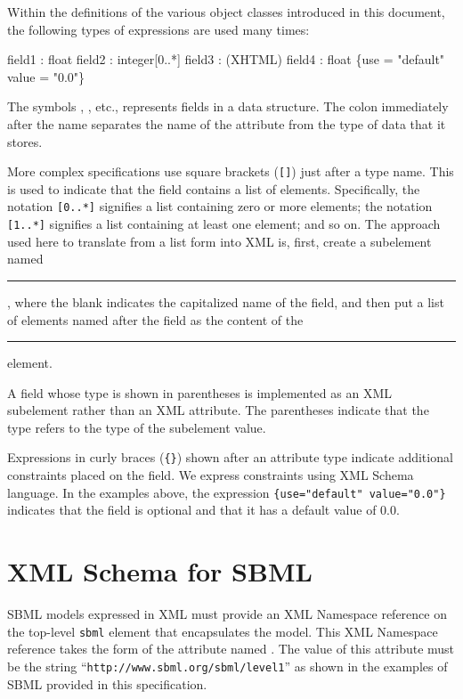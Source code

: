 \documentclass[10pt]{cekarticle}
\newenvironment{blockChanged}{\color{BrickRed}}{}
\begin{document}
Within the definitions of the various object classes introduced in this
document, the following types of expressions are used many times:

\begin{example}
  field1 : float
  field2 : integer[0..*]
  field3 : (XHTML)
  field4 : float \{use = "default" value = "0.0"\}
\end{example}

The symbols , , etc., represents fields in a
data structure.  The colon immediately after the name separates the name of
the attribute from the type of data that it stores.

More complex specifications use square brackets (\texttt{[]}) just after a
type name.  This is used to indicate that the field contains a list of
elements.  Specifically, the notation \texttt{[0..*]} signifies a list
containing zero or more elements; the notation \texttt{[1..*]} signifies a
list containing at least one element; and so on.  The approach used here to
translate from a list form into XML is, first, create a subelement named
\rule{0.5in}{0.5pt}, where the blank indicates the
capitalized name of the field, and then put a list of elements named after
the field as the content of the \rule{0.5in}{0.5pt}
element.

A field whose type is shown in parentheses is implemented as an XML
subelement rather than an XML attribute.  The parentheses indicate that the
type refers to the type of the subelement value.

Expressions in curly braces (\texttt{\{\}}) shown after an attribute type
indicate additional constraints placed on the field.  We express constraints
using XML Schema language.  In the examples above, the expression
\texttt{\{use="default" value="0.0"\}} indicates that the field 
is optional and that it has a default value of $0.0$.



\section{XML Schema for SBML}
\label{apdx:schemas}

\begin{blockChanged}
  SBML models expressed in XML must provide an XML Namespace reference on
  the top-level \texttt{sbml} element that encapsulates the model.  This
  XML Namespace reference takes the form of the attribute named
  .  The value of this attribute must be the string
  ``\texttt{http://www.sbml.org/sbml/level1}'' as shown in the examples of
  SBML provided in this specification.
\end{blockChanged}
\end{document}
